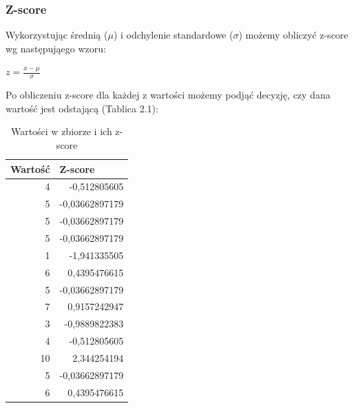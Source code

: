 \documentclass[oneside]{book}
\begin{document}
\subsubsection*{Z-score}
Wykorzystując średnią ($\mu$)  i odchylenie standardowe ($\sigma$)  możemy obliczyć z-score wg następująego wzoru:

$\displaystyle z={\frac {x-\mu }{\sigma }}$

Po obliczeniu z-score dla każdej z wartości możemy podjąć decyzję, czy dana wartość jest odstającą (Tablica 2.1): 
\begin{table}[H]
    \begin{center}
    \begin{tabular}{|r|r|}
    \hline
    \multicolumn{1}{|l|}{Wartość} & \multicolumn{1}{l|}{Z-score}        \\ \hline
    4                             & -0,512805605                        \\ \hline
    5                             & -0,03662897179                      \\ \hline
    5                             & -0,03662897179                      \\ \hline
    5                             & -0,03662897179                      \\ \hline
    {\color[HTML]{FE0000} 1}      & {\color[HTML]{FE0000} -1,941335505} \\ \hline
    6                             & 0,4395476615                        \\ \hline
    5                             & -0,03662897179                      \\ \hline
    7                             & 0,9157242947                        \\ \hline
    3                             & -0,9889822383                       \\ \hline
    4                             & -0,512805605                        \\ \hline
    {\color[HTML]{FE0000} 10}     & {\color[HTML]{FE0000} 2,344254194}  \\ \hline
    5                             & -0,03662897179                      \\ \hline
    6                             & 0,4395476615                        \\ \hline
    \end{tabular}
    \caption{Wartości w zbiorze i ich z-score}
    \end{center}
    \end{table}
\end{document}
